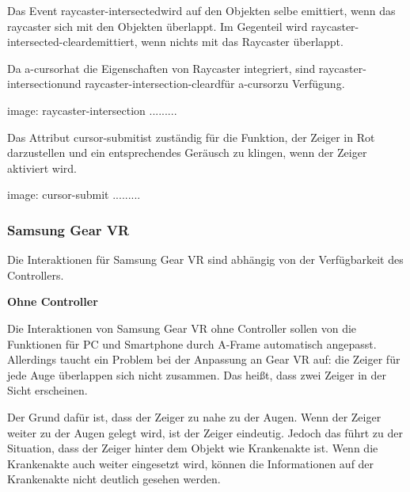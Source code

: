   Das Event \glqq raycaster-intersected\grqq wird auf den Objekten selbe emittiert, wenn das raycaster sich mit den Objekten überlappt. Im Gegenteil wird \glqq raycaster-intersected-cleard\grqq emittiert, wenn nichts mit das Raycaster überlappt.
  
  Da \glqq a-cursor\grqq hat die Eigenschaften von Raycaster integriert, sind \glqq raycaster-intersection\grqq und \glqq raycaster-intersection-cleard\grqq für \glqq a-cursor\grqq zu Verfügung.
  
  image: raycaster-intersection .........
  
  Das Attribut \glqq cursor-submit\grqq ist zuständig für die Funktion, der Zeiger in Rot darzustellen und ein entsprechendes Geräusch zu klingen, wenn der Zeiger aktiviert wird. 
  
  image: cursor-submit .........
  
  \subsubsection{Samsung Gear VR}
  Die Interaktionen für Samsung Gear VR sind abhängig von der Verfügbarkeit des Controllers.
  
  \textbf{Ohne Controller}
  
  Die Interaktionen von Samsung Gear VR ohne Controller sollen von die Funktionen für PC und Smartphone durch A-Frame automatisch angepasst. Allerdings taucht ein Problem bei der Anpassung an Gear VR auf: die Zeiger für jede Auge überlappen sich nicht zusammen. Das heißt, dass zwei Zeiger in der Sicht erscheinen.
  
  Der Grund dafür ist, dass der Zeiger zu nahe zu der Augen. Wenn der Zeiger weiter zu der Augen gelegt wird, ist der Zeiger eindeutig. Jedoch das führt zu der Situation, dass der Zeiger hinter dem Objekt wie Krankenakte ist. Wenn die Krankenakte auch weiter eingesetzt wird, können die Informationen auf der Krankenakte nicht deutlich gesehen werden.
  
